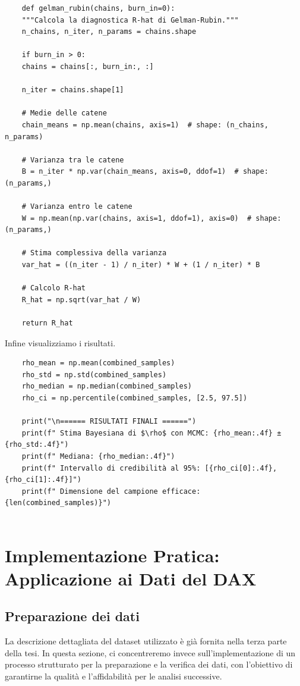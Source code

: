 \documentclass[%
	corpo=11pt,
    twoside,
    stile=classica,
    oldstyle,
    tipotesi=custom,
    greek,
    evenboxes,
]{toptesi}
\begin{document}
\begin{verbatim}
	def gelman_rubin(chains, burn_in=0):
	"""Calcola la diagnostica R-hat di Gelman-Rubin."""
	n_chains, n_iter, n_params = chains.shape
	
	if burn_in > 0:
	chains = chains[:, burn_in:, :]
	
	n_iter = chains.shape[1]
	
	# Medie delle catene
	chain_means = np.mean(chains, axis=1)  # shape: (n_chains, n_params)
	
	# Varianza tra le catene
	B = n_iter * np.var(chain_means, axis=0, ddof=1)  # shape: (n_params,)
	
	# Varianza entro le catene
	W = np.mean(np.var(chains, axis=1, ddof=1), axis=0)  # shape: (n_params,)
	
	# Stima complessiva della varianza
	var_hat = ((n_iter - 1) / n_iter) * W + (1 / n_iter) * B
	
	# Calcolo R-hat
	R_hat = np.sqrt(var_hat / W)
	
	return R_hat
\end{verbatim}
Infine visualizziamo i risultati.
\begin{verbatim}
	rho_mean = np.mean(combined_samples)
	rho_std = np.std(combined_samples)
	rho_median = np.median(combined_samples)
	rho_ci = np.percentile(combined_samples, [2.5, 97.5])
	
	print("\n====== RISULTATI FINALI ======")
	print(f" Stima Bayesiana di $\rho$ con MCMC: {rho_mean:.4f} ± {rho_std:.4f}")
	print(f" Mediana: {rho_median:.4f}")
	print(f" Intervallo di credibilità al 95%: [{rho_ci[0]:.4f}, {rho_ci[1]:.4f}]")
	print(f" Dimensione del campione efficace: {len(combined_samples)}")
	
\end{verbatim}
\newpage
\section{Implementazione Pratica: Applicazione ai Dati del DAX}
\subsection{Preparazione dei dati}
La descrizione dettagliata del dataset utilizzato è già fornita nella terza parte della tesi. In questa sezione, ci concentreremo invece sull'implementazione di un processo strutturato per la preparazione e la verifica dei dati, con l'obiettivo di garantirne la qualità e l'affidabilità per le analisi successive.
\end{document}
